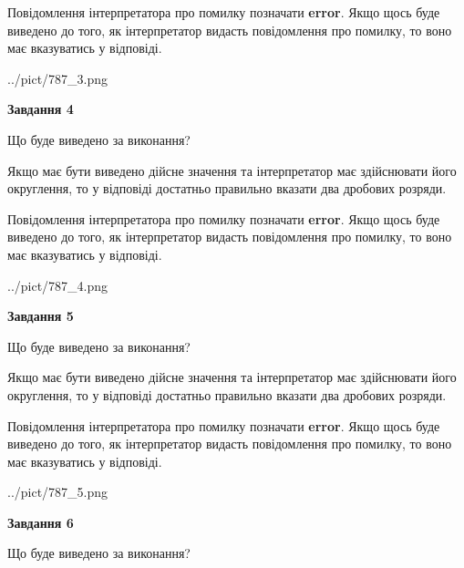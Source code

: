 \documentclass[12pt, ukrainian]{article}
\begin{document}
{\begin {Large}
Повідомлення інтерпретатора про помилку позначати \textbf{error}.
Якщо щось буде виведено до того, як інтерпретатор видасть повідомлення про помилку, 
то воно має вказуватись у відповіді. \par

\begin{center}
	{../pict/787_3.png}
\end{center}
\newpage

{\begin {center}\textbf{Завдання 4}\end {center}}\par
Що буде виведено за виконання? \par

Якщо має бути виведено дійсне значення та інтерпретатор має здійснювати його округлення, 
то у відповіді достатньо правильно вказати два дробових розряди.

Повідомлення інтерпретатора про помилку позначати \textbf{error}.
Якщо щось буде виведено до того, як інтерпретатор видасть повідомлення про помилку, 
то воно має вказуватись у відповіді. \par

\begin{center}
	{../pict/787_4.png}
\end{center}
\newpage

{\begin {center}\textbf{Завдання 5}\end {center}}\par
Що буде виведено за виконання? \par

Якщо має бути виведено дійсне значення та інтерпретатор має здійснювати його округлення, 
то у відповіді достатньо правильно вказати два дробових розряди.

Повідомлення інтерпретатора про помилку позначати \textbf{error}.
Якщо щось буде виведено до того, як інтерпретатор видасть повідомлення про помилку, 
то воно має вказуватись у відповіді. \par

\begin{center}
	{../pict/787_5.png}
\end{center}
\newpage

{\begin {center}\textbf{Завдання 6}\end {center}}\par
Що буде виведено за виконання? \par


\end{Large}}
\end{document}

